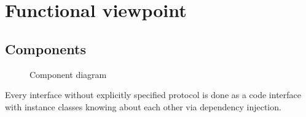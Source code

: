 \section{Functional viewpoint}

\subsection{Components}

\begin{figure}[H]
  \label{fig:viewpoint-functional-components}
  \caption{Component diagram}
\end{figure}

Every interface without explicitly specified protocol is done as a code interface with instance classes knowing about each other via dependency injection.

